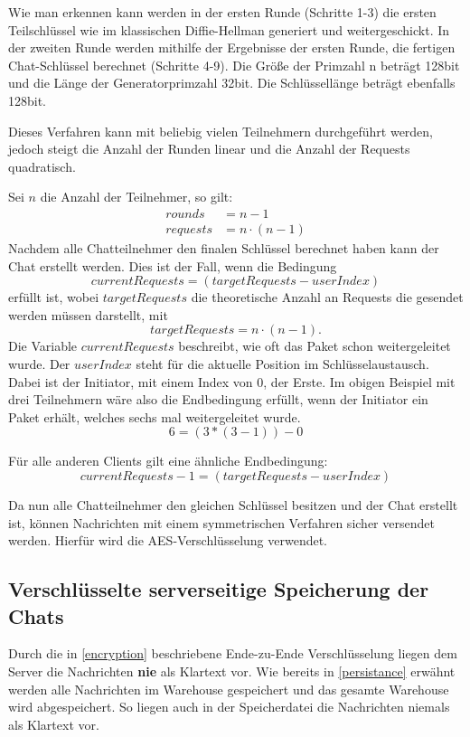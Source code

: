Wie man erkennen kann werden in der ersten Runde (Schritte 1-3) die ersten Teilschlüssel wie im klassischen Diffie-Hellman generiert und weitergeschickt.
In der zweiten Runde werden mithilfe der Ergebnisse der ersten Runde, die fertigen Chat-Schlüssel berechnet (Schritte 4-9).
Die Größe der Primzahl n beträgt 128bit und die Länge der Generatorprimzahl 32bit. Die Schlüssellänge beträgt ebenfalls 128bit.

Dieses Verfahren kann mit beliebig vielen Teilnehmern durchgeführt werden, 
jedoch steigt die Anzahl der Runden linear und die Anzahl der Requests quadratisch.

Sei $n$ die Anzahl der Teilnehmer, so gilt:
\[
\begin{split}
  rounds &= n - 1\\
  requests &= n \cdot (n - 1)  
\end{split}
\]
Nachdem alle Chatteilnehmer den finalen Schlüssel berechnet haben kann der Chat erstellt werden. Dies ist der Fall,
wenn die Bedingung $$ currentRequests = (targetRequests - userIndex) $$ erfüllt ist, wobei $targetRequests$ die theoretische Anzahl
an Requests die gesendet werden müssen darstellt, mit $$targetRequests = n \cdot (n-1).$$
Die Variable $currentRequests$ beschreibt, wie oft das Paket schon weitergeleitet wurde.
Der $userIndex$ steht für die aktuelle Position im Schlüsselaustausch. Dabei ist der Initiator, mit einem Index von 0, der Erste.
Im obigen Beispiel mit drei Teilnehmern wäre also die Endbedingung erfüllt, wenn der Initiator ein Paket erhält, 
welches sechs mal weitergeleitet wurde.
$$ 6 = (3 * (3 - 1)) - 0 $$



Für alle anderen Clients gilt eine ähnliche Endbedingung: $$ currentRequests - 1 = (targetRequests - userIndex) $$

Da nun alle Chatteilnehmer den gleichen Schlüssel besitzen und der Chat erstellt ist, können Nachrichten mit 
einem symmetrischen Verfahren sicher versendet werden. Hierfür wird die AES-Verschlüsselung verwendet.

\author{Troy Keßler}
\subsection{Verschlüsselte serverseitige Speicherung der Chats}
Durch die in \ref{encryption} beschriebene Ende-zu-Ende Verschlüsselung liegen dem Server die Nachrichten \textbf{nie} als Klartext vor.
Wie bereits in \ref{persistance} erwähnt werden alle Nachrichten im Warehouse gespeichert und das gesamte Warehouse wird abgespeichert.
So liegen auch in der Speicherdatei die Nachrichten niemals als Klartext vor.
